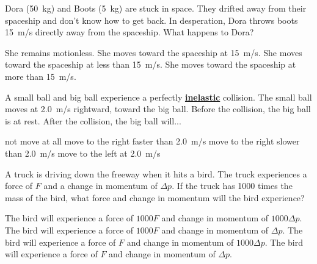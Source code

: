 \documentclass[]{exam}
\begin{document}
\begin{questions}
\question
Dora (\SI{50}{kg}) and Boots (\SI{5}{kg}) are stuck in space.  They drifted away from their spaceship and don’t know how to get back.  In desperation, Dora throws boots \SI{15}{m/s} directly away from the spaceship. What happens to Dora?

\begin{randomizechoices}[norandomize]
    \choice She remains motionless.
    \choice She moves toward the spaceship at \SI{15}{m/s}.
    \correctchoice She moves toward the spaceship at less than \SI{15}{m/s}.
    \choice She moves toward the spaceship at more than \SI{15}{m/s}.
\end{randomizechoices}

\question
A small ball and big ball experience a perfectly \textbf{\underline{inelastic}} collision. The small ball moves at \SI{2.0}{m/s} rightward, toward the big ball. Before the collision, the big ball is at rest. After the collision, the big ball will...

\begin{center}
\end{center}

\begin{randomizechoices}[norandomize]
    \choice not move at all
    \choice move to the right faster than \SI{2.0}{m/s}
    \correctchoice move to the right slower than \SI{2.0}{m/s}
    \choice move to the left at \SI{2.0}{m/s}
\end{randomizechoices}


\question
A truck is driving down the freeway when it hits a bird. The truck experiences a force of $F$ and a change in momentum of $\Delta p$. If the truck has 1000 times the mass of the bird, what force and change in momentum will the bird experience?

\begin{randomizechoices}[norandomize]
    \choice The bird will experience a force of $1000 F$ and change in momentum of $1000 \Delta p$.
    \choice The bird will experience a force of $1000 F$ and change in momentum of $\Delta p$.
    \choice The bird will experience a force of $F$ and change in momentum of $1000 \Delta p$.
    \correctchoice The bird will experience a force of $F$ and change in momentum of $\Delta p$.
\end{randomizechoices}


\end{questions}
\end{document}
